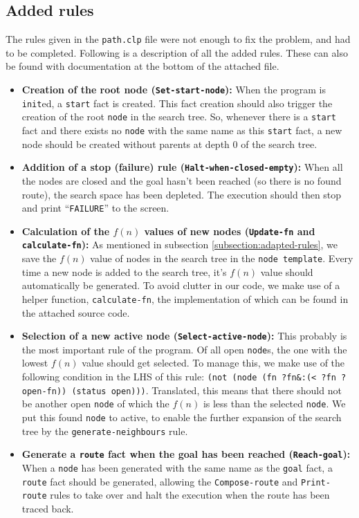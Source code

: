\documentclass[12pt, a4paper]{article}
\begin{document}
\subsection{Added rules}
The rules given in the \texttt{path.clp} file were not enough to fix the problem, and had to be completed. Following is a description of all the added rules. These can also be found with documentation at the bottom of the attached file.

\begin{itemize}
\item \textbf{Creation of the root node (\texttt{Set-start-node}):} When the program is \texttt{init}ed, a \texttt{start} fact is created. This fact creation should also trigger the creation of the root \texttt{node} in the search tree. So, whenever there is a \texttt{start} fact and there exists no \texttt{node} with the same name as this \texttt{start} fact, a new node should be created without parents at depth $0$ of the search tree.
\item \textbf{Addition of a stop (failure) rule (\texttt{Halt-when-closed-empty}):} When all the nodes are closed and the goal hasn't been reached (so there is no found route), the search space has been depleted. The execution should then stop and print ``\texttt{FAILURE}'' to the screen.
\item \textbf{Calculation of the $f(n)$ values of new nodes (\texttt{Update-fn} and \texttt{calculate-fn}):} As mentioned in subsection \ref{subsection:adapted-rules}, we save the $f(n)$ value of nodes in the search tree in the \texttt{node template}. Every time a new node is added to the search tree, it's $f(n)$ value should automatically be generated. To avoid clutter in our code, we make use of a helper function, \texttt{calculate-fn}, the implementation of which can be found in the attached source code.
\item \textbf{Selection of a new active node (\texttt{Select-active-node}):} This probably is the most important rule of the program. Of all open \texttt{node}s, the one with the lowest $f(n)$ value should get selected. To manage this, we make use of the following condition in the LHS of this rule: \texttt{(not (node (fn ?fn\&:(< ?fn ?open-fn)) (status open)))}. Translated, this means that there should not be another open \texttt{node} of which the $f(n)$ is less than the selected \texttt{node}. We put this found \texttt{node} to active, to enable the further expansion of the search tree by the \texttt{generate-neighbours} rule.
\item \textbf{Generate a \texttt{route} fact when the goal has been reached (\texttt{Reach-goal}):} When a \texttt{node} has been generated with the same name as the \texttt{goal} fact, a \texttt{route} fact should be generated, allowing the \texttt{Compose-route} and \texttt{Print-route} rules to take over and halt the execution when the route has been traced back.
\end{itemize}
\end{document}
